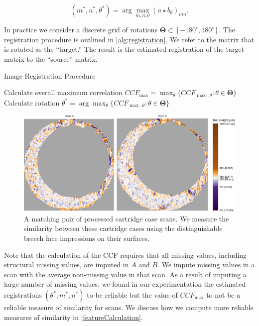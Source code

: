 \documentclass[reprint]{JASA}
\begin{document}
\[
(m^*,n^*,\theta^*) = \arg \max_{m,n,\theta} (a \star b_\theta)_{mn}.
\]

In practice we consider a discrete grid of rotations
\(\pmb{\Theta} \subset [-180^\circ,180^\circ]\). The registration
procedure is outlined in \autoref{alg:registration}. We refer to the
matrix that is rotated as the ``target.'' The result is the estimated
registration of the target matrix to the ``source'' matrix.

\begin{algorithm}[htbp]
\caption{Image Registration Procedure}\label{alg:registration}
Calculate overall maximum correlation $CCF_{\max} = \max_{\theta} \{CCF_{\max,\theta} : \theta \in \pmb{\Theta}\}$\;
Calculate rotation $\theta^* = \arg \max_{\theta} \{CCF_{\max,\theta} : \theta \in \pmb{\Theta}\}$\;
\end{algorithm}

\begin{figure}[htbp]
\includegraphics[width=.5\textwidth]{figures/matchPair} \caption{\label{fig:matchPair} A matching pair of processed cartridge case scans. We measure the similarity between these cartridge cases using the distinguishable breech face impressions on their surfaces.}\label{fig:unnamed-chunk-3}
\end{figure}

Note that the calculation of the CCF requires that all missing values,
including structural missing values, are imputed in \(A\) and \(B\). We
impute missing values in a scan with the average non-missing value in
that scan. As a result of imputing a large number of missing values, we
found in our experimentation the estimated registrations
\((\theta^*, m^*, n^*)\) to be reliable but the value of \(CCF_{\max}\)
to not be a reliable measure of similarity for scans. We discuss how we
compute more reliable measures of similarity in
\ref{featureCalculation}.
\end{document}
